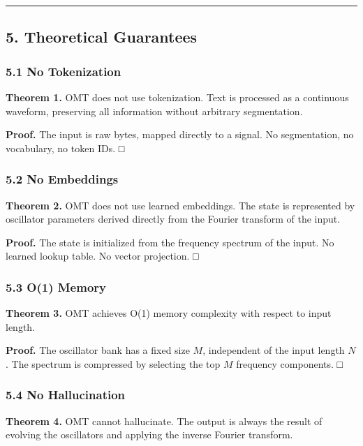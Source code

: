 \documentclass[
  11pt,
  a4paper,
]{article}
\begin{document}
\begin{center}\rule{0.5\linewidth}{0.5pt}\end{center}

\subsection{5. Theoretical Guarantees}\label{theoretical-guarantees}

\subsubsection{5.1 No Tokenization}\label{no-tokenization}

\textbf{Theorem 1.} OMT does not use tokenization. Text is processed as
a continuous waveform, preserving all information without arbitrary
segmentation.

\textbf{Proof.} The input is raw bytes, mapped directly to a signal. No
segmentation, no vocabulary, no token IDs. □

\subsubsection{5.2 No Embeddings}\label{no-embeddings}

\textbf{Theorem 2.} OMT does not use learned embeddings. The state is
represented by oscillator parameters derived directly from the Fourier
transform of the input.

\textbf{Proof.} The state is initialized from the frequency spectrum of
the input. No learned lookup table. No vector projection. □

\subsubsection{5.3 O(1) Memory}\label{o1-memory}

\textbf{Theorem 3.} OMT achieves O(1) memory complexity with respect to
input length.

\textbf{Proof.} The oscillator bank has a fixed size \(M\), independent
of the input length \(N\). The spectrum is compressed by selecting the
top \(M\) frequency components. □

\subsubsection{5.4 No Hallucination}\label{no-hallucination}

\textbf{Theorem 4.} OMT cannot hallucinate. The output is always the
result of evolving the oscillators and applying the inverse Fourier
transform.
\end{document}
